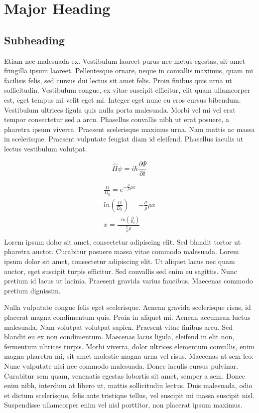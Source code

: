 \section{Major Heading}
\subsection{Subheading}

Etiam nec malesuada ex. Vestibulum laoreet purus nec metus egestas, sit amet fringilla ipsum laoreet. Pellentesque ornare, neque in convallis maximus, quam mi facilisis felis, sed cursus dui lectus sit amet felis. Proin finibus quis urna ut sollicitudin. Vestibulum congue, ex vitae suscipit efficitur, elit quam ullamcorper est, eget tempus mi velit eget mi. Integer eget nunc eu eros cursus bibendum. Vestibulum ultrices ligula quis nulla porta malesuada. Morbi vel mi vel erat tempor consectetur sed a arcu. Phasellus convallis nibh ut erat posuere, a pharetra ipsum viverra. Praesent scelerisque maximus urna. Nam mattis ac massa in scelerisque. Praesent vulputate feugiat diam id eleifend. Phasellus iaculis ut lectus vestibulum volutpat.

\begin{equation} %
     \hat{H} \psi = i \hbar \frac{\partial \Psi}{\partial t}
\end{equation}

\begin{align} %
     \frac{D}{D_0} = e^{-\frac{\mu}{\rho}\rho x} \\
    ln\left(\frac{D}{D_0}\right) = -\frac{\mu}{\rho}\rho x \\
    x = \frac{-ln\left(\frac{D}{D_0}\right)}{\frac{\mu}{\rho}\rho} \\
\end{align}
Lorem ipsum dolor sit amet, consectetur adipiscing elit. Sed blandit tortor ut pharetra auctor. Curabitur posuere massa vitae commodo malesuada. Lorem ipsum dolor sit amet, consectetur adipiscing elit. Ut aliquet lacus nec quam auctor, eget suscipit turpis efficitur. Sed convallis sed enim eu sagittis. Nunc pretium id lacus ut lacinia. Praesent gravida varius faucibus. Maecenas commodo pretium dignissim.

Nulla vulputate congue felis eget scelerisque. Aenean gravida scelerisque risus, id placerat magna condimentum quis. Proin in aliquet mi. Aenean accumsan luctus malesuada. Nam volutpat volutpat sapien. Praesent vitae finibus arcu. Sed blandit eu ex non condimentum. Maecenas lacus ligula, eleifend in elit non, fermentum ultrices turpis. Morbi viverra, dolor ultrices elementum convallis, enim magna pharetra mi, sit amet molestie magna urna vel risus. Maecenas at sem leo. Nunc vulputate nisi nec commodo malesuada. Donec iaculis cursus pulvinar. Curabitur sem quam, venenatis egestas lobortis sit amet, semper a sem. Donec enim nibh, interdum at libero ut, mattis sollicitudin lectus. Duis malesuada, odio et dictum scelerisque, felis ante tristique tellus, vel suscipit mi massa suscipit nisl. Suspendisse ullamcorper enim vel nisl porttitor, non placerat ipsum maximus.

